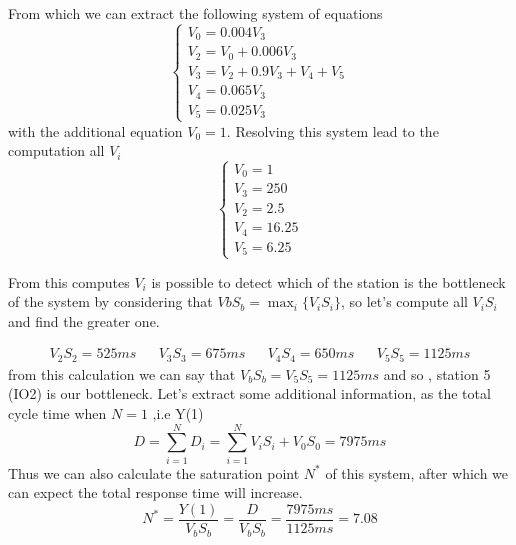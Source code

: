 \documentclass[12pt,a4paper]{article}
\begin{document}
    From which we can extract the following system of equations 
    \begin{displaymath}
        \begin{cases}
            V_0=0.004V_3\\
            V_2=V_0+0.006V_3\\
            V_3=V_2+0.9V_3+V_4+V_5\\
            V_4=0.065V_3\\
            V_5= 0.025V_3
        \end{cases}
    \end{displaymath}
    with the additional equation $V_0=1$. Resolving this system lead to the computation 
    all $V_i$ 
    \begin{displaymath}
        \begin{cases}
            V_0=1 \\
            V_3=250\\
            V_2=2.5\\
            V_4=16.25\\
            V_5=6.25
        \end{cases}
    \end{displaymath}

    From this computes $V_i$ is possible to detect which of the station is the bottleneck of the system
    by considering that $VbS_b= \max_i\{V_iS_i\}$, so let's compute all $V_iS_i$ and find 
    the greater one. 

    \begin{displaymath}
        \begin{aligned}
            V_2S_2= 525ms && V_3S_3=675ms && V_4S_4=650ms && V_5S_5= 1125ms
        \end{aligned}
    \end{displaymath}
    from this calculation we can say that $V_bS_b=V_5S_5=1125ms$ and so , station 5 (IO2) is 
    our bottleneck. Let's extract some additional information, as the total cycle time when $N=1$ ,i.e Y(1) 
    \begin{displaymath}
        D=\sum_{i=1}^{N}D_i=\sum_{i=1}^{N}V_iS_i + V_0S_0=7975ms
    \end{displaymath}
    Thus we can also calculate the saturation point $N^*$ of this system, after which we can expect
    the total response time will increase. 
    \begin{displaymath}
        N^*=\frac{Y(1)}{V_bS_b}=\frac{D}{V_bS_b}=\frac{7975ms}{1125ms}=7.08
    \end{displaymath}
\end{document}
